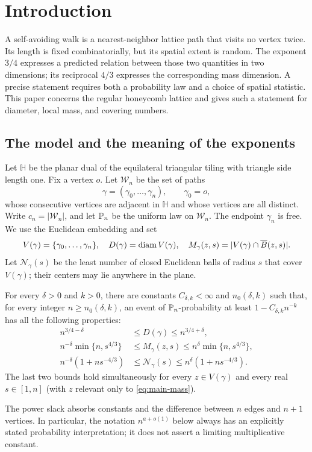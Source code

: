\section{Introduction}\label{sec:introduction}
A self-avoiding walk is a nearest-neighbor lattice path that visits no vertex twice. Its length is fixed combinatorially, but its spatial extent is random. The exponent $3/4$ expresses a predicted relation between those two quantities in two dimensions; its reciprocal $4/3$ expresses the corresponding mass dimension. A precise statement requires both a probability law and a choice of spatial statistic. This paper concerns the regular honeycomb lattice and gives such a statement for diameter, local mass, and covering numbers.

\subsection{The model and the meaning of the exponents}
Let $\mathbb H$ be the planar dual of the equilateral triangular tiling with triangle side length one. Fix a vertex $o$. Let $\mathcal W_n$ be the set of paths
\[
\gamma=(\gamma_0,\ldots,\gamma_n),\qquad \gamma_0=o,
\]
whose consecutive vertices are adjacent in $\mathbb H$ and whose vertices are all distinct. Write $c_n=|\mathcal W_n|$, and let $\mathbb P_n$ be the uniform law on $\mathcal W_n$. The endpoint $\gamma_n$ is free. We use the Euclidean embedding and set
\[
V(\gamma)=\{\gamma_0,\ldots,\gamma_n\},\quad
D(\gamma)=\operatorname{diam} V(\gamma),\quad
M_\gamma(z,s)=|V(\gamma)\cap\overline B(z,s)|.
\]
Let $\mathcal N_\gamma(s)$ be the least number of closed Euclidean balls of radius $s$ that cover $V(\gamma)$; their centers may lie anywhere in the plane.

\begin{theorem}\label{thm:main}\label{09_fast_paths:fixed-length}
For every $\delta>0$ and $k>0$, there are constants $C_{\delta,k}<\infty$ and $n_0(\delta,k)$ such that, for every integer $n\ge n_0(\delta,k)$, an event of $\mathbb P_n$-probability at least $1-C_{\delta,k}n^{-k}$ has all the following properties:
\begin{align}
 n^{3/4-\delta}&\le D(\gamma)\le n^{3/4+\delta},\label{eq:main-diameter}\\
 n^{-\delta}\min\{n,s^{4/3}\}
 &\le M_\gamma(z,s)\le n^{\delta}\min\{n,s^{4/3}\},\label{eq:main-mass}\\
 n^{-\delta}(1+ns^{-4/3})
 &\le \mathcal N_\gamma(s)\le n^{\delta}(1+ns^{-4/3}).\label{eq:main-cover}
\end{align}
The last two bounds hold simultaneously for every $z\in V(\gamma)$ and every real $s\in[1,n]$ (with $z$ relevant only to \eqref{eq:main-mass}).
\end{theorem}
The power slack absorbs constants and the difference between $n$ edges and $n+1$ vertices. In particular, the notation $n^{a+o(1)}$ below always has an explicitly stated probability interpretation; it does not assert a limiting multiplicative constant.

